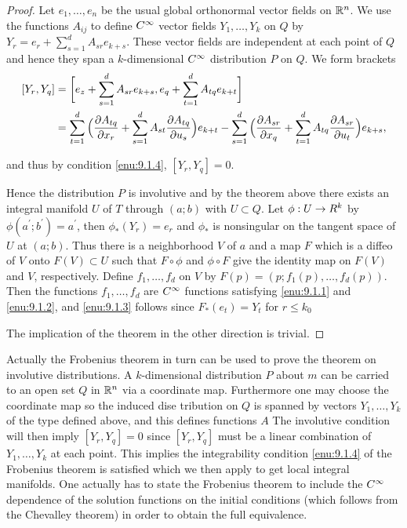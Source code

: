 \documentclass[../main]{subfiles}
\begin{document}
\begin{proof}

Let $e_{1}, \ldots, e_{n}$ be the usual global orthonormal vector fields on $\mathbb{R}^{n}$. We use the functions $A_{i j}$ to define $C^\infty$ vector fields $Y_{1}, \ldots, Y_{k}$ on $Q$ by \newline $Y_{r}=e_{r}+\sum_{s=1}^{d} A_{s r} e_{k+s}$. These vector fields are independent at each point of $Q$ and hence they span a $k$-dimensional $C^\infty$ distribution $P$ on $Q .$ We form brackets
\[\begin{split}
[Y_{r}, Y_{q}]&=\bigg[e_{z}+\sum_{s=1}^{d} A_{s r} e_{k+s}, e_{q}+\sum_{t=1}^{d} A_{t q} e_{k+t}\bigg]\\
&=\sum_{t=1}^{d}\Big(\dfrac{\partial A_{tq}}{\partial x_r}+\sum_{s=1}^{d} A_{s t} \dfrac{\partial A_{tq}}{\partial u_s}\Big) e_{k+t}-\sum_{s=1}^{d}\Big(\dfrac{\partial A_{sr}}{\partial x_q}+\sum_{t=1}^{d} A_{t q} \dfrac{\partial A_{sr}}{\partial u_t}\Big) e_{k+s},\end{split}\]

and thus by condition  \ref{enu:9.1.4}, $[Y_{r}, Y_{q}]=0$.

Hence the distribution $P$ is involutive and by the theorem above there exists an integral manifold $U$ of $T$ through $(a ; b)$ with $U \subset Q$. Let $\phi: U \to R^{k}$ by $\phi(a^{\prime} ; b^{\prime})=a^{\prime}$, then $\phi_{\ast}(Y_{r})=e_r$ and $\phi_{*}$ is nonsingular on the tangent space of $U$ at $(a ; b)$. Thus there is a neighborhood $V$ of $a$ and a map $F$ which is a diffeo of $V$ onto $F(V) \subset U$ such that $F \circ \phi$ and $\phi \circ F$ give the identity map on $F(V)$ and $V$, respectively. Define $f_{1}, \ldots, f_{d}$ on $V$ by $F(p)=(p ; f_{1}(p), \ldots, f_{d}(p))$. Then the functions $f_{1}, \ldots, f_{d}$ are $C^\infty$ functions satisfying  \ref{enu:9.1.1} and \ref{enu:9.1.2}, and \ref{enu:9.1.3} follows since $F_{\ast}(e_{t})=Y_{t}$ for $r \leq k_{0}$

The implication of the theorem in the other direction is trivial.\end{proof} 

Actually the Frobenius theorem in turn can be used to prove the theorem on involutive distributions. A $k$-dimensional distribution $P$ about $m$ can be carried to an open set $Q$ in $\mathbb{R}^{n}$ via a coordinate map. Furthermore one may choose the coordinate map so the induced dise tribution on $Q$ is spanned by vectors $Y_{1}, \ldots, Y_{k}$ of the type defined above, and this defines functions $A$ The involutive condition will then imply $[Y_{r}, Y_{q}]=0$ since $[Y_{r}, Y_{q}]$ must be a linear combination of $Y_{1}, \ldots, Y_{k}$ at each point. This implies the integrability condition \ref{enu:9.1.4} of the Frobenius theorem is satisfied which we then apply to get local integral manifolds. One actually has to state the Frobenius theorem to include the $C^\infty$ dependence of the solution functions on the initial conditions (which follows from the Chevalley theorem) in order to obtain the full equivalence. %
\end{document}
